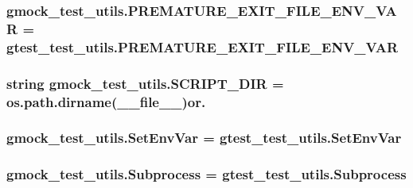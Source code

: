\subsubsection[{\texorpdfstring{P\+R\+E\+M\+A\+T\+U\+R\+E\+\_\+\+E\+X\+I\+T\+\_\+\+F\+I\+L\+E\+\_\+\+E\+N\+V\+\_\+\+V\+AR}{PREMATURE_EXIT_FILE_ENV_VAR}}]{\setlength{\rightskip}{0pt plus 5cm}gmock\+\_\+test\+\_\+utils.\+P\+R\+E\+M\+A\+T\+U\+R\+E\+\_\+\+E\+X\+I\+T\+\_\+\+F\+I\+L\+E\+\_\+\+E\+N\+V\+\_\+\+V\+AR = gtest\+\_\+test\+\_\+utils.\+P\+R\+E\+M\+A\+T\+U\+R\+E\+\_\+\+E\+X\+I\+T\+\_\+\+F\+I\+L\+E\+\_\+\+E\+N\+V\+\_\+\+V\+AR}\hypertarget{namespacegmock__test__utils_a9392c288e6da3024d65ec0bddc0d86c3}{}\label{namespacegmock__test__utils_a9392c288e6da3024d65ec0bddc0d86c3}
\subsubsection[{\texorpdfstring{S\+C\+R\+I\+P\+T\+\_\+\+D\+IR}{SCRIPT_DIR}}]{\setlength{\rightskip}{0pt plus 5cm}string gmock\+\_\+test\+\_\+utils.\+S\+C\+R\+I\+P\+T\+\_\+\+D\+IR = os.\+path.\+dirname(\+\_\+\+\_\+file\+\_\+\+\_\+)or\textquotesingle{}.\textquotesingle{}}\hypertarget{namespacegmock__test__utils_a4ef94affd9d889f78d67be80017eeddd}{}\label{namespacegmock__test__utils_a4ef94affd9d889f78d67be80017eeddd}
\subsubsection[{\texorpdfstring{Set\+Env\+Var}{SetEnvVar}}]{\setlength{\rightskip}{0pt plus 5cm}gmock\+\_\+test\+\_\+utils.\+Set\+Env\+Var = gtest\+\_\+test\+\_\+utils.\+Set\+Env\+Var}\hypertarget{namespacegmock__test__utils_ab0c69f8ce649fdd5a17f99deedf3eb29}{}\label{namespacegmock__test__utils_ab0c69f8ce649fdd5a17f99deedf3eb29}
\subsubsection[{\texorpdfstring{Subprocess}{Subprocess}}]{\setlength{\rightskip}{0pt plus 5cm}gmock\+\_\+test\+\_\+utils.\+Subprocess = {\bf gtest\+\_\+test\+\_\+utils.\+Subprocess}}\hypertarget{namespacegmock__test__utils_a31a0e33565ec805d314cb0a4eb8317e6}{}\label{namespacegmock__test__utils_a31a0e33565ec805d314cb0a4eb8317e6}
